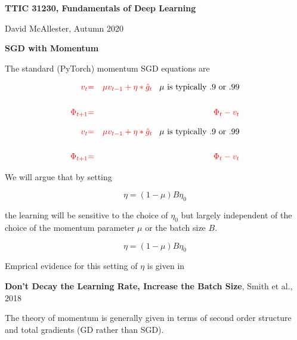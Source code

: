 


\newcommand{\solution}[1]{\bigskip {\bf Solution}: #1}



{\Huge
  \centerline{\bf TTIC 31230, Fundamentals of Deep Learning}
  \bigskip
  \centerline{David McAllester, Autumn 2020}
  \vfill
  \centerline{\bf SGD with Momentum}
  \vfill
  \vfill


The standard (PyTorch) momentum SGD equations are

\begin{eqnarray*}
  {\color{red} v_t} & {\color{red} =} & {\color{red} \mu v_{t-1} + \eta * \hat{g}_t} \;\;\;\mbox{$\mu$ is typically .9 or .99}\\
  \\
  {\color{red} \Phi_{t+1}} & {\color{red} =} & {\color{red} \Phi_t -  v_t} \\
\end{eqnarray*}


\begin{eqnarray*}
  {\color{red} v_t} & {\color{red} =} & {\color{red} \mu v_{t-1} + \eta * \hat{g}_t} \;\;\;\mbox{$\mu$ is typically .9 or .99}\\
  \\
  {\color{red} \Phi_{t+1}} & {\color{red} =} & {\color{red} \Phi_t -  v_t} \\
\end{eqnarray*}

\vfill
We will argue that by setting

{\color{red} $$\eta = (1-\mu)B\eta_0$$}

\vfill
the learning will be sensitive to the choice of $\eta_0$ but largely independent of the choice of the momentum parameter $\mu$ or the batch size $B$.


{\color{red} $$\eta = (1-\mu)B\eta_0$$}

\vfill
Emprical evidence for this setting of $\eta$ is given in

\vfill
{\bf Don't Decay the Learning Rate, Increase the Batch Size}, Smith et al., 2018


The theory of momentum is generally given in terms of second order structure and total gradients (GD rather than SGD).

}
